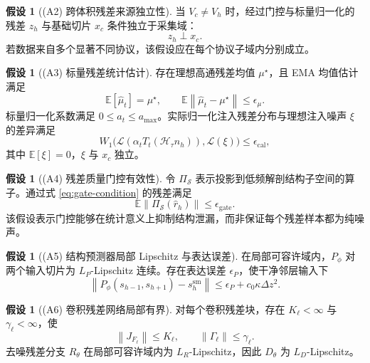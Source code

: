 \documentclass[11pt,a4paper,UTF8,fontset=fandol]{ctexart}
\theoremstyle{definition}
\newtheorem{assumption}[theorem]{假设}
\newcommand{\norm}[1]{\left\lVert#1\right\rVert}
\newcommand{\E}{\mathbb{E}}
\newcommand{\cH}{\mathcal{H}}
\newcommand{\cS}{\mathcal{S}}
\begin{document}
\begin{assumption}[(A2) 跨体积残差来源独立性]
当 $V_c\ne V_h$ 时，经过门控与标量归一化的残差 $z_h$ 与基础切片 $x_c$ 条件独立于采集域：
\begin{equation}
    z_h\perp x_c.
\end{equation}
若数据来自多个显著不同协议，该假设应在每个协议子域内分别成立。
\end{assumption}

\begin{assumption}[(A3) 标量残差统计估计]
存在理想高通残差均值 $\mu^\star$，且 EMA 均值估计满足
\begin{equation}
    \E[\hat\mu_t]=\mu^\star,
    \qquad
    \E\norm{\hat\mu_t-\mu^\star}\le\epsilon_\mu.
\end{equation}
标量归一化系数满足 $0\le a_t\le a_{\max}$。实际归一化注入残差分布与理想注入噪声 $\xi$ 的差异满足
\begin{equation}
\label{eq:scalar-calibration}
    W_1\big(\mathcal L(\alpha_t T_t(\cH_\tau n_h)),
    \mathcal L(\xi)\big)\le\epsilon_{\mathrm{cal}},
\end{equation}
其中 $\E[\xi]=0$，$\xi$ 与 $x_c$ 独立。
\end{assumption}

\begin{assumption}[(A4) 残差质量门控有效性]
令 $\Pi_{\cS}$ 表示投影到低频解剖结构子空间的算子。通过式 \eqref{eq:gate-condition} 的残差满足
\begin{equation}
    \E\norm{\Pi_{\cS}(\hat r_h)}\le\epsilon_{\mathrm{gate}}.
\end{equation}
该假设表示门控能够在统计意义上抑制结构泄漏，而非保证每个残差样本都为纯噪声。
\end{assumption}

\begin{assumption}[(A5) 结构预测器局部 Lipschitz 与表达误差]
在局部可容许域内，$P_\phi$ 对两个输入切片为 $L_P$-Lipschitz 连续。存在表达误差 $\epsilon_P$，使干净邻层输入下
\begin{equation}
\label{eq:predictor-expression}
    \norm{
    P_\phi(s_{h-1},s_{h+1})-s_h^{\mathrm{sm}}
    }
    \le
    \epsilon_P+c_0\kappa\Delta z^2.
\end{equation}
\end{assumption}

\begin{assumption}[(A6) 卷积残差网络局部有界]
对每个卷积残差块，存在 $K_\ell<\infty$ 与 $\gamma_\ell<\infty$，使
\begin{equation}
    \norm{J_{F_\ell}}\le K_\ell,
    \qquad
    \norm{\Gamma_\ell}\le\gamma_\ell.
\end{equation}
去噪残差分支 $R_\theta$ 在局部可容许域内为 $L_R$-Lipschitz，因此 $D_\theta$ 为 $L_D$-Lipschitz。
\end{assumption}
\end{document}
